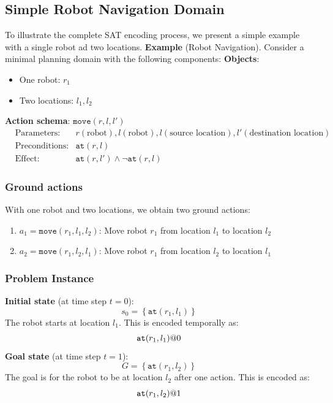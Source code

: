\documentclass[a4paper]{article}
\theoremstyle{definition}
\begin{document}
\subsection{Simple Robot Navigation Domain}
To illustrate the complete SAT encoding process, we present a simple example with a single 
robot ad two locations.
\vspace{1em}
\noindent
\newline
\textbf{Example} (Robot Navigation). Consider a minimal planning domain with the following components:
\vspace{1em}
\noindent
\newline
\textbf{Objects}:
\begin{itemize}
    \item One robot: \( r_1 \)    
    \item Two locations: \( l_1, l_2 \) 
\end{itemize}
\textbf{Action schema}: \( \texttt{move}(r,l,l') \)    
\begin{align*}
    &\text{Parameters:} & r(\text{robot}), l(\text{robot}),l(\text{source location}),l'(\text{destination location})\\
    &\text{Preconditions:} & \texttt{at}(r,l)\\
    &\text{Effect:} & \texttt{at}(r,l') \wedge \lnot \texttt{at}(r,l)
\end{align*}
\subsubsection{Ground actions}
With one robot and two locations, we obtain two ground actions:
\begin{enumerate}
    \item \( a_1 = \texttt{move}(r_1,l_1,l_2) \): Move robot \( r_1 \) from location \( l_1 \) to location \( l_2 \)    
    \item \( a_2 = \texttt{move}(r_1,l_2,l_1) \): Move robot \( r_1 \) from location \( l_2 \) to location \( l_1 \)
\end{enumerate}
\subsubsection{Problem Instance}
\textbf{Initial state} (at time step $t = 0$):
\[
  s_0 = \left\{\texttt{at}(r_1,l_1) \right\}
\]
The robot starts at location \( l_1 \). This is encoded temporally as:
\[
  \texttt{at}(r_1,l_1)\symbol{64}0
\]
\textbf{Goal state} (at time step $t = 1$):
\[
  G = \left\{ \texttt{at}(r_1,l_2) \right\}
\]
The goal is for the robot to be at location \( l_2 \) after one action. This is encoded as:
\[
  \texttt{at}(r_1,l_2)\symbol{64}1
\]
\end{document}
